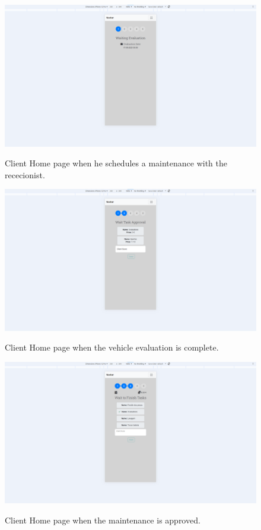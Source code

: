 \begin{figure}[h]
  \caption{Client Home page when he schedules a maintenance with the rececionist.}
  \centering
  \includegraphics[width=\textwidth]{figs/Implementation/client/MaintenanceState1}
  \label{fig:MaintenanceState1}
\end{figure}

\begin{figure}[h]
  \caption{Client Home page when the vehicle evaluation is complete.}
  \centering
  \includegraphics[width=\textwidth]{figs/Implementation/client/MaintenanceState2}
  \label{fig:MaintenanceState2}
\end{figure}

\begin{figure}[h]
  \caption{Client Home page when the maintenance is approved.}
  \centering
  \includegraphics[width=\textwidth]{figs/Implementation/client/MaintenanceState3}
  \label{fig:MaintenanceState3}
\end{figure}


